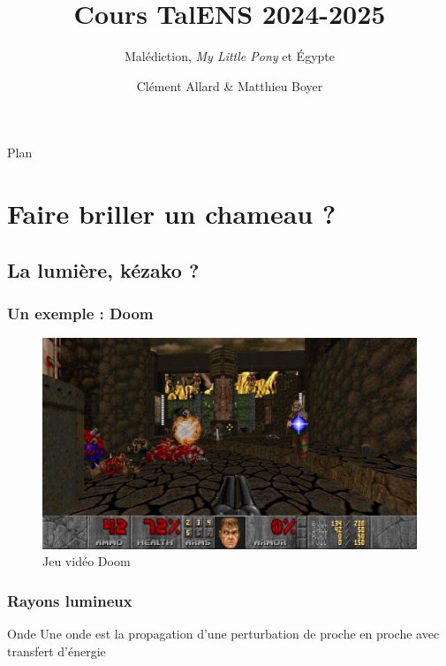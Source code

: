 \documentclass{beamercours}
\title{Cours TalENS 2024-2025}
\subtitle{Malédiction, \textit{My Little Pony} et Égypte}
\author{Clément Allard \& Matthieu Boyer}
\begin{document}
\maketitle
\begin{frame}{Plan}\tableofcontents[sectionstyle=show]
\end{frame}

\section{Faire briller un chameau ?}
\subsection{La lumière, kézako ?}

\begin{frame}
	\frametitle{Un exemple : Doom}
    \begin{figure}
        \includegraphics[scale = .07]{Doom.jpg}
        \caption{Jeu vidéo Doom}
    \end{figure}
\end{frame}

\begin{frame}
	\frametitle{Rayons lumineux}
\begin{définition}{Onde}{}
Une onde est la propagation d'une perturbation de proche en proche avec transfert d'énergie
\end{définition}

\end{frame}
\end{document}
